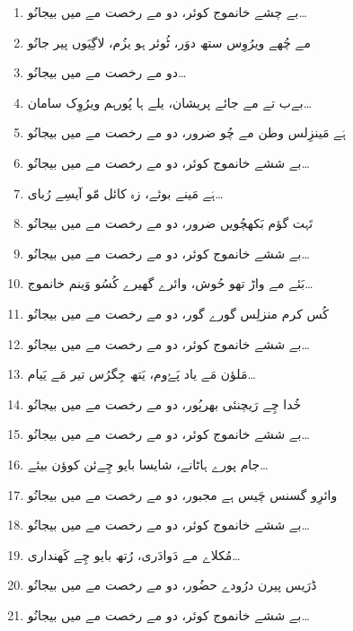 \documentclass[12pt]{article}
\newcommand{\bigarabic}[1]{\fontsize{16pt}{18pt}\selectfont \textarabic{#1}}
\begin{document}
\begin{multicols}{2}
\begin{multicols}{2}
\columnbreak

\begin{RTL}
\begin{enumerate}[leftmargin=*, label=\arabic*., font=\fontsize{16pt}{18pt}\selectfont]
  \item \bigarabic{بے چشے خانموج کوئر، دو مے رخصت مے میں بیجانُو…}
  \item \bigarabic{مے چُھے ویرُوِس ستھ دوَر، ٹُوئر ہو یزُم، لاگِیَوں پیر جانُو}
  \item \bigarabic{دو مے رخصت مے میں بیجانُو…}
  \item \bigarabic{بےب تے مے جائے پریشان، یلے ہا پُورہم ویرُوِک سامان…}
  \item \bigarabic{ہَے مَینزِلس وطن مے چُو ضرور، دو مے رخصت مے میں بیجانُو}
  \item \bigarabic{بے ششے خانموج کوئر، دو مے رخصت مے میں بیجانُو…}
  \item \bigarabic{ہَے مَینے بوئے، زہ کائل مّو آیسِے رُبای…}
  \item \bigarabic{تَہت گؤم بَکھچُویں ضرور، دو مے رخصت مے میں بیجانُو}
  \item \bigarabic{بے ششے خانموج کوئر، دو مے رخصت مے میں بیجانُو…}
  \item \bigarabic{بَئے مے واڑ تھو حُوش، وائرے گھیرے کُسُو وَینم خانموج…}
  \item \bigarabic{کُس کرم منزلِس گورے گور، دو مے رخصت مے میں بیجانُو}
  \item \bigarabic{بے ششے خانموج کوئر، دو مے رخصت مے میں بیجانُو…}
  \item \bigarabic{مَلؤن مَے یاد پَےُوم، یَتھ جِگرُس تیر مَے یَیام…}
  \item \bigarabic{خُدا چِے رَیچنئی بھرپُور، دو مے رخصت مے میں بیجانُو}
  \item \bigarabic{بے ششے خانموج کوئر، دو مے رخصت مے میں بیجانُو…}
  \item \bigarabic{جام پورے ہاٹانے، شایسا بایو چِےئن کوؤن بیئے…}
  \item \bigarabic{وائرِو گسنس چَیس ہے مجبور، دو مے رخصت مے میں بیجانُو}
  \item \bigarabic{بے ششے خانموج کوئر، دو مے رخصت مے میں بیجانُو…}
  \item \bigarabic{مُکلاے مے دَوادَری، رُتھ بایو چِے کَھنداری…}
  \item \bigarabic{ڈرَیس پیرن درُودے حضُور، دو مے رخصت مے میں بیجانُو}
  \item \bigarabic{بے ششے خانموج کوئر، دو مے رخصت مے میں بیجانُو…}
\end{enumerate}
\end{RTL}
\end{multicols}



\end{multicols}
\end{document}
